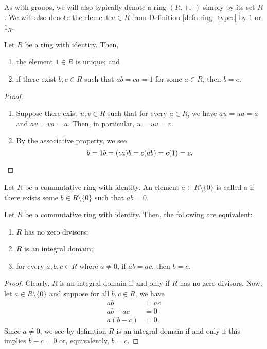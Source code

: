As with groups, we will also typically denote a ring $ (R,+,\cdot) $ simply by its set $ R $. We will also denote the element $ u\in R $ from Definition \ref{defn:ring_types} by $ 1 $ or $ 1_R $.

\begin{prop}
Let $ R $ be a ring with identity. Then,
\begin{enumerate}
    \item the element $ 1\in R $ is unique; and
    \item if there exist $ b,c\in R $ such that $ ab=ca=1 $ for some $ a\in R $, then $ b=c $.
\end{enumerate}
\end{prop}
\begin{proof}~
\begin{enumerate}
    \item Suppose there exist $ u,v\in R $ such that for every $ a\in R $, we have $ au=ua=a $ and $ av=va=a $. Then, in particular, $ u=uv=v $.

    \item By the associative property, we see
    \begin{equation*}
        b=1b=(ca)b=c(ab)=c(1)=c.\qedhere
    \end{equation*}
\end{enumerate}
\end{proof}

\begin{defn}
Let $ R $ be a commutative ring with identity. An element $ a\in R\setminus\{0\} $ is called a  if there exists some $ b\in R\setminus\{0\} $ such that $ ab=0 $.
\end{defn}

\begin{prop}
Let $ R $ be a commutative ring with identity. Then, the following are equivalent:
\begin{enumerate}
    \item $ R $ has no zero divisors;
    \item $ R $ is an integral domain;
    \item for every $ a,b,c\in R $ where $ a\neq 0 $, if $ ab=ac $, then $ b=c $.
\end{enumerate}
\end{prop}
\begin{proof}
Clearly, $ R $ is an integral domain if and only if $ R $ has no zero divisors. Now, let $ a\in R\setminus\{0\} $ and suppose for all $ b,c\in R $, we have
\begin{align*}
    ab &= ac \\
    ab-ac &= 0 \\
    a(b-c) &= 0.
\end{align*}
Since $ a\neq 0 $, we see by definition $ R $ is an integral domain if and only if this implies $ b-c=0 $ or, equivalently, $ b=c $.
\end{proof}

